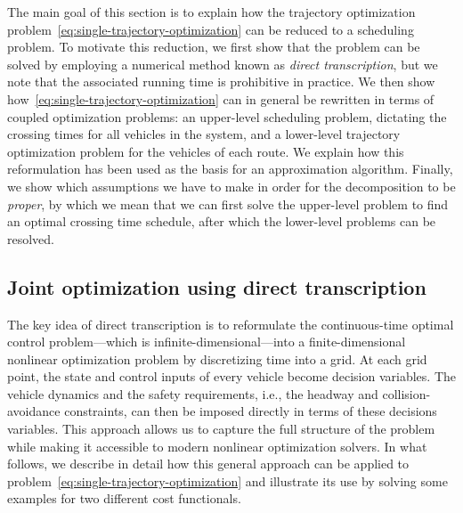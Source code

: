 \documentclass[a4paper]{report}
\theoremstyle{definition}
\theoremstyle{plain}
\begin{document}
The main goal of this section is to explain how the trajectory optimization
problem~\eqref{eq:single-trajectory-optimization} can be reduced to a scheduling
problem.
%
To motivate this reduction, we first show that the problem can be solved by
employing a numerical method known as \emph{direct transcription}, but we note
that the associated running time is prohibitive in practice.
%
We then show how~\eqref{eq:single-trajectory-optimization} can in general be
rewritten in terms of coupled optimization problems: an upper-level scheduling
problem, dictating the crossing times for all vehicles in the system, and a
lower-level trajectory optimization problem for the vehicles of each route. We
explain how this reformulation has been used as the basis for an approximation
algorithm.
%
Finally, we show which assumptions we have to make in order for the
decomposition to be \emph{proper}, by which we mean that we can first solve the
upper-level problem to find an optimal crossing time schedule, after which the
lower-level problems can be resolved.


\subsection{Joint optimization using direct transcription}\label{sec:direct-transcription}

The key idea of direct transcription is to reformulate the continuous-time
optimal control problem---which is infinite-dimensional---into a
finite-dimensional nonlinear optimization problem by discretizing time into a
grid.
%
At each grid point, the state and control inputs of every vehicle become
decision variables. The vehicle dynamics and the safety requirements, i.e., the
headway and collision-avoidance constraints, can then be imposed directly in
terms of these decisions variables.
%
This approach allows us to capture the full structure of the problem while
making it accessible to modern nonlinear optimization solvers.
%
In what follows, we describe in detail how this general approach can be applied
to problem~\eqref{eq:single-trajectory-optimization} and illustrate its use by
solving some examples for two different cost functionals.
\end{document}
